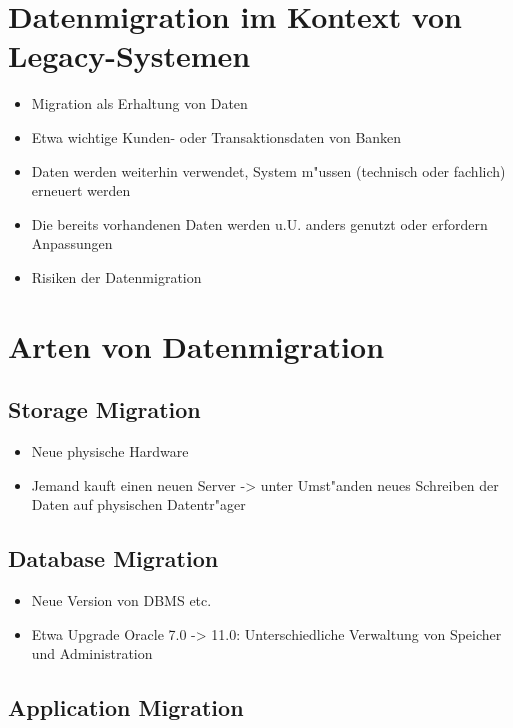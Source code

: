 \documentclass[11pt]{scrartcl}
\begin{document}
\section{Datenmigration im Kontext von Legacy-Systemen}


\begin{itemize}
	\item Migration als Erhaltung von Daten
	\item Etwa wichtige Kunden- oder Transaktionsdaten von Banken
	\item Daten werden weiterhin verwendet, System m"ussen (technisch oder fachlich) erneuert werden
	\item Die bereits vorhandenen Daten werden u.U. anders genutzt oder erfordern Anpassungen
	\item Risiken der Datenmigration
\end{itemize}

\section{Arten von Datenmigration}

\subsection{Storage Migration}

\begin{itemize}
	\item Neue physische Hardware
	\item Jemand kauft einen neuen Server -> unter Umst"anden neues Schreiben der Daten auf physischen Datentr"ager
\end{itemize}

\subsection{Database Migration}

\begin{itemize}
	\item Neue Version von DBMS etc.
	\item Etwa Upgrade Oracle 7.0 -> 11.0: Unterschiedliche Verwaltung von Speicher und Administration
\end{itemize}

\subsection{Application Migration}
\end{document}
